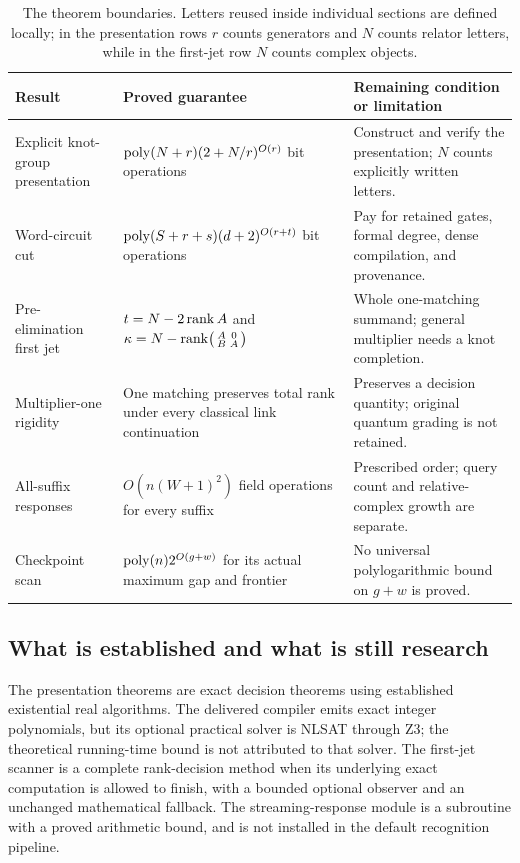 \begin{table}[htbp]
\centering\small
\begin{tabularx}{\textwidth}{@{}p{}YY@{}}
\toprule
Result & Proved guarantee & Remaining condition or limitation\\
\midrule
Explicit knot-group presentation &
$\operatorname{poly}(N+r)(2+N/r)^{O(r)}$ bit operations &
Construct and verify the presentation; $N$ counts explicitly written letters.\\
Word-circuit cut &
$\operatorname{poly}(S+r+s)(d+2)^{O(r+t)}$ bit operations &
Pay for retained gates, formal degree, dense compilation, and provenance.\\
Pre-elimination first jet &
$t=N-2\operatorname{rank} A$ and $\kappa=N-\operatorname{rank}\bigl(\begin{smallmatrix}A&0\\B&A\end{smallmatrix}\bigr)$ &
Whole one-matching summand; general multiplier needs a knot completion.\\
Multiplier-one rigidity &
One matching preserves total rank under every classical link continuation &
Preserves a decision quantity; original quantum grading is not retained.\\
All-suffix responses &
$O(n(W+1)^2)$ field operations for every suffix &
Prescribed order; query count and relative-complex growth are separate.\\
Checkpoint scan &
$\operatorname{poly}(n)2^{O(g+w)}$ for its actual maximum gap and frontier &
No universal polylogarithmic bound on $g+w$ is proved.\\
\bottomrule
\end{tabularx}
\caption{The theorem boundaries. Letters reused inside individual sections
are defined locally; in the presentation rows $r$ counts generators and $N$
counts relator letters, while in the first-jet row $N$ counts complex objects.}
\label{tab:results}
\end{table}

\subsection{What is established and what is still research}

The presentation theorems are exact decision theorems using established
existential real algorithms. The delivered compiler emits exact integer
polynomials, but its optional practical solver is NLSAT through Z3; the
theoretical running-time bound is not attributed to that solver. The
first-jet scanner is a complete rank-decision method when its underlying
exact computation is allowed to finish, with a bounded optional observer
and an unchanged mathematical fallback. The streaming-response module is
a subroutine with a proved arithmetic bound, and is not installed in the
default recognition pipeline.

